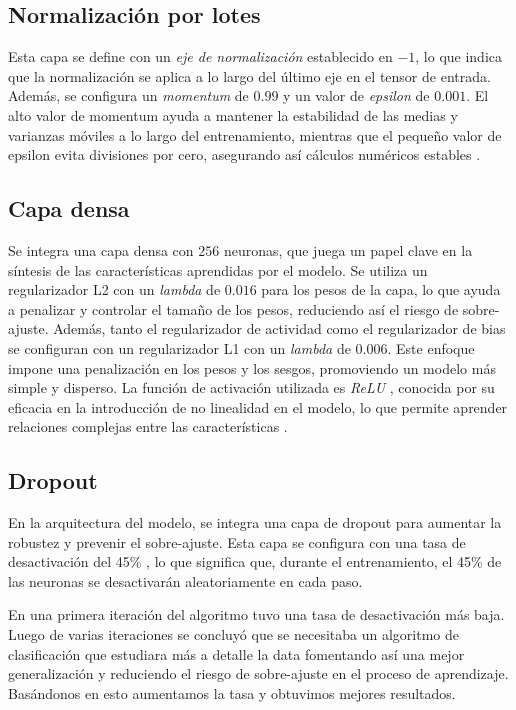    \subsection{Normalización por lotes}
   
   Esta capa se define con un \textit{eje de normalización} establecido en $-1$, lo que indica que la normalización se aplica a lo largo del último eje en el tensor de entrada. Además, se configura un \textit{momentum} de $0.99$ y un valor de \textit{epsilon} de $0.001$. El alto valor de momentum ayuda a mantener la estabilidad de las medias y varianzas móviles a lo largo del entrenamiento, mientras que el pequeño valor de epsilon evita divisiones por cero, asegurando así cálculos numéricos estables .
   
   \subsection{Capa densa}
   
   Se integra una capa densa con $256$ neuronas, que juega un papel clave en la síntesis de las características aprendidas por el modelo. Se utiliza un regularizador L2 con un \textit{lambda} de $0.016$ para los pesos de la capa, lo que ayuda a penalizar y controlar el tamaño de los pesos, reduciendo así el riesgo de sobre-ajuste. Además, tanto el regularizador de actividad como el regularizador de bias se configuran con un regularizador L1 con un \textit{lambda} de $0.006$. Este enfoque impone una penalización en los pesos y los sesgos, promoviendo un modelo más simple y disperso. La función de activación utilizada es \textit{ReLU} , conocida por su eficacia en la introducción de no linealidad en el modelo, lo que permite aprender relaciones complejas entre las características .
   
   \subsection{Dropout}
   
   En la arquitectura del modelo, se integra una capa de dropout para aumentar la robustez y prevenir el sobre-ajuste. Esta capa se configura con una tasa de desactivación del 45\% , lo que significa que, durante el entrenamiento, el 45\% de las neuronas se desactivarán aleatoriamente en cada paso. 
   
   En una primera iteración del algoritmo tuvo una tasa de desactivación más baja. Luego de varias iteraciones se concluyó que se necesitaba un algoritmo de clasificación que estudiara más a detalle la data fomentando así una mejor generalización y reduciendo el riesgo de sobre-ajuste en el proceso de aprendizaje. Basándonos en esto aumentamos la tasa y obtuvimos mejores resultados.
   
